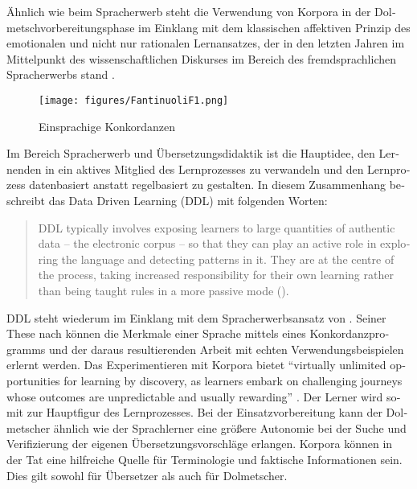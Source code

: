 \documentclass[output=paper]{LSP/langsci}
\begin{document}
\begin{otherlanguage}{ngerman}
Ähnlich wie beim Spracherwerb steht die Verwendung von Korpora in der Dolmetschvorbereitungsphase im Einklang mit dem klassischen affektiven Prinzip des emotionalen und nicht nur rationalen Lernansatzes, der in den letzten Jahren im Mittelpunkt des wissenschaftlichen Diskurses im Bereich des fremdsprachlichen Spracherwerbs stand \citep[240]{balboni_sfide_2002}.


\begin{figure}
\texttt{[image: figures/FantinuoliF1.png]}
\caption{Einsprachige Konkordanzen}
\label{fig:fantinuoli:1}
\end{figure} 

Im Bereich Spracherwerb und Übersetzungsdidaktik ist die Hauptidee, den Lernenden in ein aktives Mitglied des  Lernprozesses zu verwandeln \citep{Kiraly2000} und den Lernprozess datenbasiert anstatt regelbasiert zu gestalten. In diesem Zusammenhang beschreibt \citeauthor{boultondatadriven2009} das Data Driven Learning (DDL) mit folgenden Worten:


\begin{quote}
DDL typically involves exposing learners to large quantities of authentic data -- the electronic corpus -- so that they can play an active role in exploring the language and detecting patterns in it. They are at the centre of the process, taking increased responsibility for their own learning rather than being taught rules in a more passive mode (\citeyear[82]{boultondatadriven2009}). 
\end{quote}

DDL steht wiederum im Einklang mit dem Spracherwerbsansatz von \citet{odlin_printout_1994}. 
Seiner These nach können die Merkmale einer Sprache mittels eines Konkordanzprogramms und der daraus resultierenden Arbeit mit echten Verwendungsbeispielen erlernt werden. Das Experimentieren mit Korpora bietet “virtually unlimited opportunities for learning by discovery, as learners embark on challenging journeys whose outcomes are unpredictable and usually rewarding” \citep[246]{Bernardini2001}. Der Lerner wird somit zur Hauptfigur des Lernprozesses. Bei der Einsatzvorbereitung kann der Dolmetscher ähnlich wie der Sprachlerner eine größere Autonomie bei der Suche und Verifizierung der eigenen Übersetzungsvorschläge erlangen. Korpora können in der Tat eine hilfreiche Quelle für Terminologie und faktische Informationen sein. Dies gilt sowohl für Übersetzer \citep{friedbichler_potential_2000,Zanettin2002,castagnoli_wacky_2006,Hansen-Schirra2008} als auch für Dolmetscher.


\end{otherlanguage}
\end{document}
